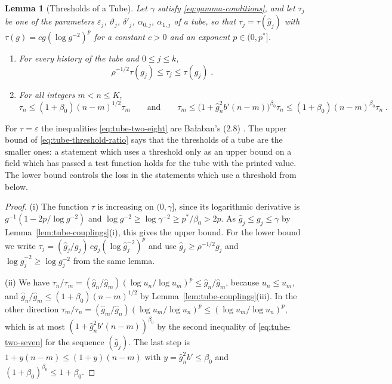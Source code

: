 \documentclass[11pt]{preprint}
\numberwithin{equation}{section}
\newtheorem{lemma}[theorem]{Lemma}
\theoremstyle{definition}
\theoremstyle{remark}
\theoremstyle{plain}
\begin{document}
\begin{lemma}[Thresholds of a Tube]\label{lem:tube-thresholds}
Let $\gamma$ satisfy \eqref{eq:gamma-conditions}, and let $\tau_j$ be one of the parameters $\varepsilon_j$, $\vartheta_j$, $\delta'_j$, $\alpha_{0,j}$, $\alpha_{1,j}$ of a tube, so that $\tau_j = \tau(\hat g_j)$ with $\tau(g) = cg(\log g^{-2})^p$ for a constant $c > 0$ and an exponent $p \in (0, p^*]$.
\begin{enumerate}[label=(\roman*)]
\item For every history of the tube and $0 \leq j \leq k$,
\begin{equation}\label{eq:tube-threshold-ratio}
    \rho^{-1/2}\tau(g_j) \leq \tau_j \leq \tau(g_j)\;.
\end{equation}
\item For all integers $m < n \leq K$,
\begin{equation}\label{eq:tube-two-eight}
    \tau_n \leq (1 + \beta_0)(n - m)^{1/2}\tau_m
    \qquad\text{and}\qquad
    \tau_m \leq \bigl(1 + \hat g_n^2b'(n - m)\bigr)^{\beta_0}\tau_n \leq (1 + \beta_0)(n - m)^{\beta_0}\tau_n\;.
\end{equation}
\end{enumerate}
\end{lemma}

For $\tau = \varepsilon$ the inequalities \eqref{eq:tube-two-eight} are Ba{\l}aban's (2.8) \cite[p.~256]{BalabanCRE}. The upper bound of \eqref{eq:tube-threshold-ratio} says that the thresholds of a tube are the smaller ones: a statement which uses a threshold only as an upper bound on a field which has passed a test function holds for the tube with the printed value. The lower bound controls the loss in the statements which use a threshold from below.

\begin{proof}
(i) The function $\tau$ is increasing on $(0, \gamma]$, since its logarithmic derivative is $g^{-1}(1 - 2p/\log g^{-2})$ and $\log g^{-2} \geq \log\gamma^{-2} \geq p^*/\beta_0 > 2p$. As $\hat g_j \leq g_j \leq \gamma$ by Lemma~\ref{lem:tube-couplings}(i), this gives the upper bound. For the lower bound we write $\tau_j = (\hat g_j/g_j)\,cg_j(\log\hat g_j^{-2})^p$ and use $\hat g_j \geq \rho^{-1/2}g_j$ and $\log\hat g_j^{-2} \geq \log g_j^{-2}$ from the same lemma.

(ii) We have $\tau_n/\tau_m = (\hat g_n/\hat g_m)(\log u_n/\log u_m)^p \leq \hat g_n/\hat g_m$, because $u_n \leq u_m$, and $\hat g_n/\hat g_m \leq (1 + \beta_0)(n - m)^{1/2}$ by Lemma~\ref{lem:tube-couplings}(iii). In the other direction $\tau_m/\tau_n = (\hat g_m/\hat g_n)(\log u_m/\log u_n)^p \leq (\log u_m/\log u_n)^p$, which is at most $(1 + \hat g_n^2b'(n - m))^{\beta_0}$ by the second inequality of \eqref{eq:tube-two-seven} for the sequence $(\hat g_j)$. The last step is $1 + y(n - m) \leq (1 + y)(n - m)$ with $y = \hat g_n^2b' \leq \beta_0$ and $(1 + \beta_0)^{\beta_0} \leq 1 + \beta_0$.
\end{proof}
\end{document}

